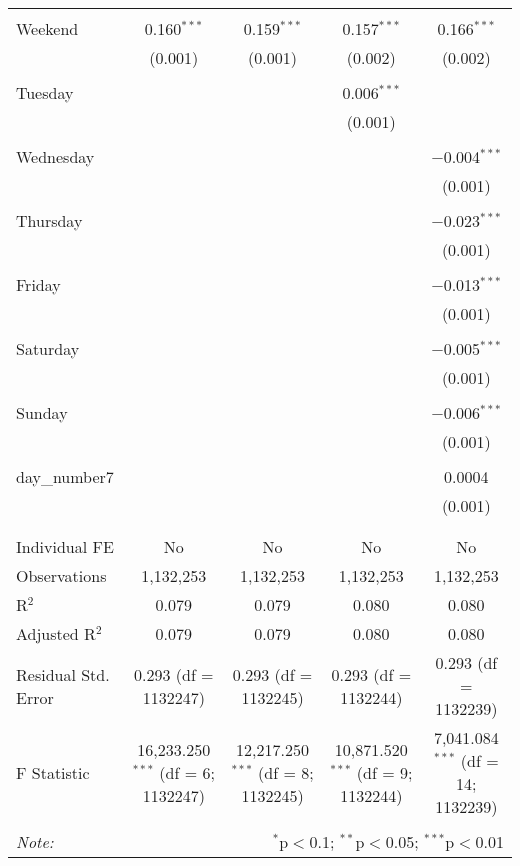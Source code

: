 \documentclass[
]{article}
\begin{document}
\begin{table}[!htbp]
{\begin{tabular}{@{\extracolsep{5pt}}lcccc}
  & & & & \\ 
 Weekend & 0.160$^{***}$ & 0.159$^{***}$ & 0.157$^{***}$ & 0.166$^{***}$ \\ 
  & (0.001) & (0.001) & (0.002) & (0.002) \\ 
  & & & & \\ 
 Tuesday &  &  & 0.006$^{***}$ &  \\ 
  &  &  & (0.001) &  \\ 
  & & & & \\ 
 Wednesday &  &  &  & $-$0.004$^{***}$ \\ 
  &  &  &  & (0.001) \\ 
  & & & & \\ 
 Thursday &  &  &  & $-$0.023$^{***}$ \\ 
  &  &  &  & (0.001) \\ 
  & & & & \\ 
 Friday &  &  &  & $-$0.013$^{***}$ \\ 
  &  &  &  & (0.001) \\ 
  & & & & \\ 
 Saturday &  &  &  & $-$0.005$^{***}$ \\ 
  &  &  &  & (0.001) \\ 
  & & & & \\ 
 Sunday &  &  &  & $-$0.006$^{***}$ \\ 
  &  &  &  & (0.001) \\ 
  & & & & \\ 
 day\_number7 &  &  &  & 0.0004 \\ 
  &  &  &  & (0.001) \\ 
  & & & & \\ 
\hline \\[-1.8ex] 
Individual FE & No & No & No & No \\ 
Observations & 1,132,253 & 1,132,253 & 1,132,253 & 1,132,253 \\ 
R$^{2}$ & 0.079 & 0.079 & 0.080 & 0.080 \\ 
Adjusted R$^{2}$ & 0.079 & 0.079 & 0.080 & 0.080 \\ 
Residual Std. Error & 0.293 (df = 1132247) & 0.293 (df = 1132245) & 0.293 (df = 1132244) & 0.293 (df = 1132239) \\ 
F Statistic & 16,233.250$^{***}$ (df = 6; 1132247) & 12,217.250$^{***}$ (df = 8; 1132245) & 10,871.520$^{***}$ (df = 9; 1132244) & 7,041.084$^{***}$ (df = 14; 1132239) \\ 
\hline 
\hline \\[-1.8ex] 
\textit{Note:}  & \multicolumn{4}{r}{$^{*}$p$<$0.1; $^{**}$p$<$0.05; $^{***}$p$<$0.01} \\ 
\end{tabular}
} 
\end{table} 
\newpage
\end{document}
